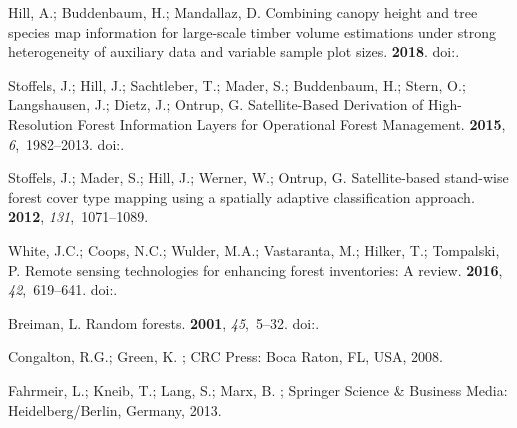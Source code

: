 \documentclass[remotesensing,article,accept,moreauthors,pdftex,10pt,a4paper]{Definitions/mdpi}
\begin{document}
\begin{thebibliography}{999}
Hill, A.; Buddenbaum, H.; Mandallaz, D.
\newblock Combining canopy height and tree species map information for
  large-scale timber volume estimations under strong heterogeneity of auxiliary
  data and variable sample plot sizes.
 {\bf 2018}.
\newblock
  doi:{\href{https://doi.org/10.1007/s10342-018-1118-z}{}}.

Stoffels, J.; Hill, J.; Sachtleber, T.; Mader, S.; Buddenbaum, H.; Stern, O.;
  Langshausen, J.; Dietz, J.; Ontrup, G.
\newblock Satellite-Based Derivation of High-Resolution Forest Information
  Layers for Operational Forest Management.
 {\bf 2015}, {\em 6},~1982--2013.
\newblock
  doi:{\href{https://doi.org/10.3390/f6061982}{}}.

Stoffels, J.; Mader, S.; Hill, J.; Werner, W.; Ontrup, G.
\newblock Satellite-based stand-wise forest cover type mapping using a
  spatially adaptive classification approach.
 {\bf 2012}, {\em
  131},~1071--1089.

White, J.C.; Coops, N.C.; Wulder, M.A.; Vastaranta, M.; Hilker, T.; Tompalski,
  P.
\newblock Remote sensing technologies for enhancing forest inventories: A
  review.
 {\bf 2016}, {\em
  42},~619--641.
\newblock
  doi:{\href{https://doi.org/10.1080/07038992.2016.1207484}{}}.

Breiman, L.
\newblock Random forests.
 {\bf 2001}, {\em 45},~5--32.
\newblock
  doi:{\href{https://doi.org/10.1023/A:1010933404324}{}}.

Congalton, R.G.; Green, K.
;  CRC Press: Boca Raton, FL, USA,  2008.


Fahrmeir, L.; Kneib, T.; Lang, S.; Marx, B.
; Springer Science
  \& Business Media: Heidelberg/Berlin, Germany, 2013.



\end{thebibliography}
\end{document}

